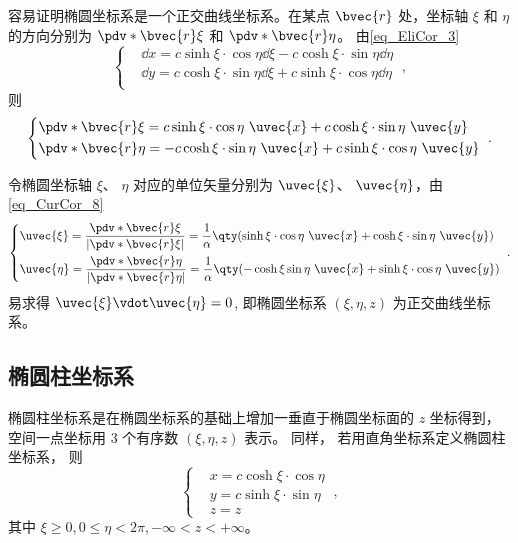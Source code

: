 容易证明椭圆坐标系是一个正交曲线坐标系。在某点 $\bvec{r}$ 处，坐标轴 $\xi$ 和 $\eta$ 的方向分别为 $\pdv*{\bvec{r}}{\xi}$ 和 $\pdv*{\bvec{r}}{\eta}$。
由\autoref{eq_EliCor_3} 
\begin{equation}
\left\{
    \begin{aligned}
    &\dd x=c\sinh\xi\cdot\cos\eta\dd\xi-c\cosh\xi\cdot\sin\eta\dd\eta\\
    &\dd y=c\cosh\xi\cdot\sin\eta\dd\xi+c\sinh\xi\cdot\cos\eta\dd\eta\\
    \end{aligned}\right.~,
\end{equation}
则
\begin{equation}
\left\{
    \begin{aligned}
&\pdv*{\bvec{r}}{\xi}=c\sinh\xi\cdot\cos\eta\ \uvec{x}+c\cosh\xi\cdot\sin\eta\ \uvec{y}\\
&\pdv*{\bvec{r}}{\eta}=-c\cosh\xi\cdot\sin\eta\ \uvec{x}+c\sinh\xi\cdot\cos\eta\ \uvec{y}\\
    \end{aligned}\right.~.
\end{equation}

令椭圆坐标轴 $\xi$、 $\eta$ 对应的单位矢量分别为 $\uvec{\xi}$、 $\uvec{\eta}$，由\autoref{eq_CurCor_8}~
\begin{equation}
\left\{
    \begin{aligned}
    &\uvec{\xi}=\frac{\pdv*{\bvec{r}}{\xi}}{|\pdv*{\bvec{r}}{\xi}|}=\frac{1}{\alpha}\qty(\sinh\xi\cdot\cos\eta\ \uvec{x}+\cosh\xi\cdot\sin\eta\ \uvec{y})\\
    &\uvec{\eta }=\frac{\pdv*{\bvec{r}}{\eta}}{|\pdv*{\bvec{r}}{\eta}|}=\frac{1}{\alpha}\qty(-\cosh\xi\sin\eta\ \uvec{x}+\sinh\xi\cdot\cos\eta\ \uvec{y})\\
    \end{aligned}\right.~.
\end{equation}
易求得 $\uvec{\xi}\vdot\uvec{\eta} = 0$,  即椭圆坐标系 $(\xi,\eta,z)$ 为正交曲线坐标系。

\subsection{椭圆柱坐标系}
椭圆柱坐标系是在椭圆坐标系的基础上增加一垂直于椭圆坐标面的 $z$ 坐标得到， 空间一点坐标用 3 个有序数 $(\xi,\eta,z)$ 表示。 同样， 若用直角坐标系定义椭圆柱坐标系， 则
\begin{equation}\label{eq_EliCor_1}
\left\{\begin{aligned}
&x=c\cosh\xi\cdot\cos\eta\\
&y=c\sinh\xi\cdot\sin\eta\\
&z=z
\end{aligned}\right.~,
\end{equation}
其中 $\xi\geq0,0\leq\eta<2\pi,-\infty<z<+\infty$。

